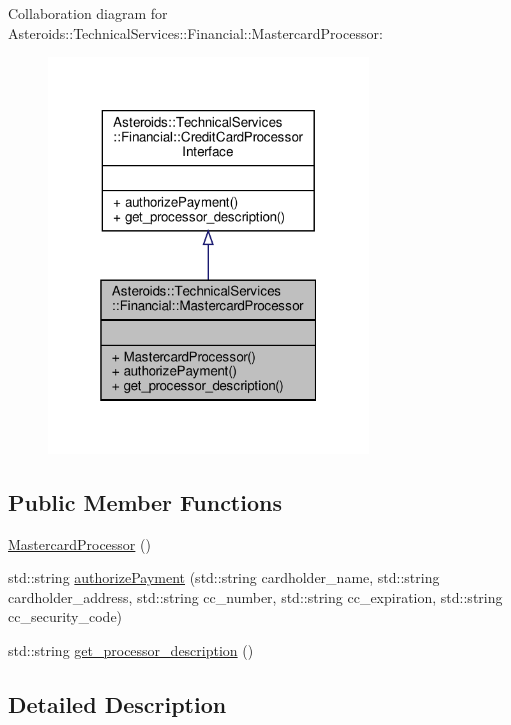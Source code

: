 Collaboration diagram for Asteroids\+:\+:Technical\+Services\+:\+:Financial\+:\+:Mastercard\+Processor\+:\nopagebreak
\begin{figure}[H]
\begin{center}
\leavevmode
\includegraphics[width=241pt]{classAsteroids_1_1TechnicalServices_1_1Financial_1_1MastercardProcessor__coll__graph}
\end{center}
\end{figure}
\subsection*{Public Member Functions}
\begin{DoxyCompactItemize}
\item 
\hyperlink{classAsteroids_1_1TechnicalServices_1_1Financial_1_1MastercardProcessor_ae20b07d008bfc76ec35c1e3075198768}{Mastercard\+Processor} ()
\item 
std\+::string \hyperlink{classAsteroids_1_1TechnicalServices_1_1Financial_1_1MastercardProcessor_a75069378c5945eb8b94b6a6c7842d814}{authorize\+Payment} (std\+::string cardholder\+\_\+name, std\+::string cardholder\+\_\+address, std\+::string cc\+\_\+number, std\+::string cc\+\_\+expiration, std\+::string cc\+\_\+security\+\_\+code)
\item 
std\+::string \hyperlink{classAsteroids_1_1TechnicalServices_1_1Financial_1_1MastercardProcessor_a3dc222f21a228d61b581af1dbbd6e93b}{get\+\_\+processor\+\_\+description} ()
\end{DoxyCompactItemize}


\subsection{Detailed Description}


